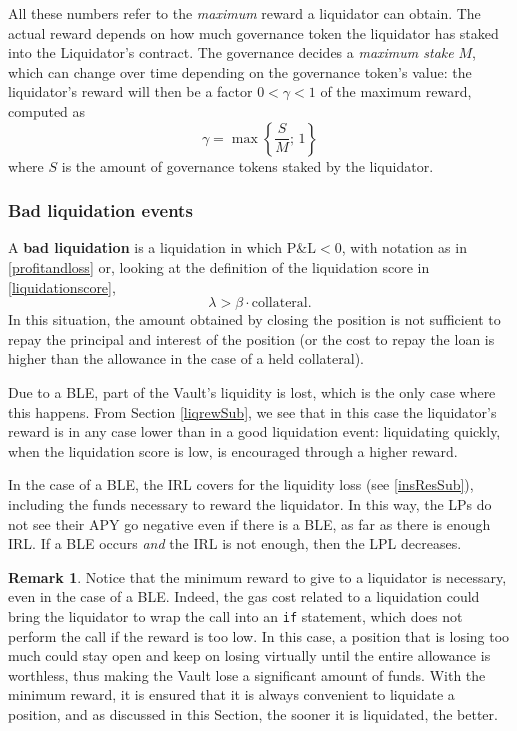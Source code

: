 \documentclass[a4paper,10 pt]{article}
\theoremstyle{definition}
\newtheorem{remark}{Remark}
\begin{document}
All these numbers refer to the {\it maximum} reward a liquidator can obtain. The actual reward depends on how much governance token the liquidator has staked into the Liquidator's contract. The governance decides a {\it maximum stake} $M$, which can change over time depending on the governance token's value: the liquidator's reward will then be a factor $0<\gamma < 1$ of the maximum reward, computed as
\begin{equation}\label{actualReward}
\gamma = \max\left\{\frac{S}{M};\, 1\right\}
\end{equation}
where $S$ is the amount of governance tokens staked by the liquidator.

\subsubsection{Bad liquidation events}\label{bleSubSub}
A {\bf bad liquidation} is a liquidation in which  $\text{P\&L} < 0$, with notation as in \eqref{profitandloss} or, looking at the definition of the liquidation score in \eqref{liquidationscore}, 
$$\lambda > \beta \cdot \text{collateral}.$$ In this situation, the amount obtained by closing the position is not sufficient to repay the principal and interest of the position (or the cost to repay the loan is higher than the allowance in the case of a held collateral).

Due to a BLE, part of the Vault's liquidity is lost, which is the only case where this happens. From Section \ref{liqrewSub}, we see that in this case the liquidator's reward is in any case lower than in a good liquidation event: liquidating quickly, when the liquidation score is low, is encouraged through a higher reward.

In the case of a BLE, the IRL covers for the liquidity loss (see \ref{insResSub}), including the funds necessary to reward the liquidator. In this way, the LPs do not see their APY go negative even if there is a BLE, as far as there is enough IRL. If a BLE occurs {\it and} the IRL is not enough, then the LPL decreases.

\begin{remark}\label{nopunishments}
Notice that the minimum reward to give to a liquidator is necessary, even in the case of a BLE. Indeed, the gas cost related to a liquidation could bring the liquidator to wrap the call into an \verb|if| statement, which does not perform the call if the reward is too low. In this case, a position that is losing too much could stay open and keep on losing virtually until the entire allowance is worthless, thus making the Vault lose a significant amount of funds. With the minimum reward, it is ensured that it is always convenient to liquidate a position, and as discussed in this Section, the sooner it is liquidated, the better.
\end{remark} 
\end{document}

